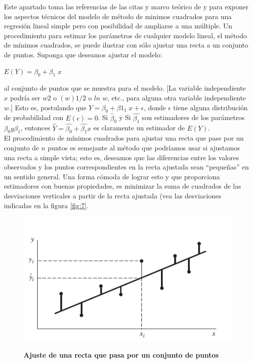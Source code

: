 Este apartado toma las referencias de las citas y marco teórico de \cite{mendenhall1994estadistica} y \cite{anderson2012estadistica} para exponer los aspectos técnicos del modelo de método de minimos cuadrados para una regresión lineal simple pero con posibilidad de ampliarse a una múltiple. Un procedimiento para estimar los parámetros de cualquier modelo lineal, el método de mínimos cuadrados, se puede ilustrar con sólo ajustar una recta a un conjunto de puntos. Suponga que deseamos ajustar el modelo:

\begin{center}
	{\large $\displaystyle E(Y)=\beta_{0}+\beta_{1} \; x$}
\end{center}

al conjunto de puntos que se muestra para el modelo. [La variable independiente $x$ podría
ser $w2$ o $(w)1/2$ o $ln$ $w$, etc., para alguna otra variable independiente $w$.] Esto es, postulando
que $Y = \beta_{0} + \beta1_{1}\; x  + \epsilon$, donde $\epsilon$ tiene alguna distribución de probabilidad con $E(\epsilon) = 0$. Si $\hat{\beta}_{0}$ y Si $\hat{\beta_{1}}$ son estimadores de los parámetros $\beta_{0} y \beta_{1}$, entonces $\hat{Y} = \hat{\beta_{0}}+\hat{\beta_{1}}x$ es claramente un
estimador de $E(Y)$.\\

El procedimiento de mínimos cuadrados para ajustar una recta que pase por un conjunto de $n$ puntos es semejante al método que podríamos usar si ajustamos una recta a simple vista; esto es, deseamos que las diferencias entre los valores observados y los puntos correspondientes en la recta ajustada sean “pequeñas” en un sentido general. Una forma cómoda de lograr esto y que proporciona estimadores con buenas propiedades, es minimizar la suma de cuadrados de las desviaciones verticales a partir de la recta ajustada (vea las desviaciones indicadas en la figura \eqref{fig:7}.


\begin{figure}[H]
	\centering
	\caption{\textbf{Ajuste de una recta que pasa por un conjunto de puntos}}
	\label{fig:7}
	\resizebox{9cm}{!} { 
		\includegraphics[width=1\linewidth]{Imagenes/Img_02}
	}
	{\scriptsize {}}
\end{figure}

